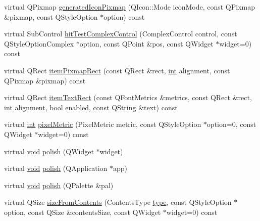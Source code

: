 \begin{DoxyCompactItemize}
\item 
virtual Q\-Pixmap \hyperlink{class_qxt_proxy_style_a77efbe530bb609a94662587fd1b6642b}{generated\-Icon\-Pixmap} (Q\-Icon\-::\-Mode icon\-Mode, const Q\-Pixmap \&pixmap, const Q\-Style\-Option $\ast$option) const 
\item 
virtual Sub\-Control \hyperlink{class_qxt_proxy_style_a85159e7d6e14121e5b3ee33955799f4e}{hit\-Test\-Complex\-Control} (Complex\-Control control, const Q\-Style\-Option\-Complex $\ast$option, const Q\-Point \&pos, const Q\-Widget $\ast$widget=0) const 
\item 
virtual Q\-Rect \hyperlink{class_qxt_proxy_style_ac4f4d852fa825842d91d3c4e7af3154a}{item\-Pixmap\-Rect} (const Q\-Rect \&rect, \hyperlink{ioapi_8h_a787fa3cf048117ba7123753c1e74fcd6}{int} alignment, const Q\-Pixmap \&pixmap) const 
\item 
virtual Q\-Rect \hyperlink{class_qxt_proxy_style_a17a6317af09989533e8a598cf64e03cc}{item\-Text\-Rect} (const Q\-Font\-Metrics \&metrics, const Q\-Rect \&rect, \hyperlink{ioapi_8h_a787fa3cf048117ba7123753c1e74fcd6}{int} alignment, bool enabled, const \hyperlink{group___u_a_v_objects_plugin_gab9d252f49c333c94a72f97ce3105a32d}{Q\-String} \&text) const 
\item 
virtual \hyperlink{ioapi_8h_a787fa3cf048117ba7123753c1e74fcd6}{int} \hyperlink{class_qxt_proxy_style_a14fd21c337d2406c05338b43bc59e9b7}{pixel\-Metric} (Pixel\-Metric metric, const Q\-Style\-Option $\ast$option=0, const Q\-Widget $\ast$widget=0) const 
\item 
virtual \hyperlink{group___u_a_v_objects_plugin_ga444cf2ff3f0ecbe028adce838d373f5c}{void} \hyperlink{class_qxt_proxy_style_ae3ad169526899e419b635bae16b2f228}{polish} (Q\-Widget $\ast$widget)
\item 
virtual \hyperlink{group___u_a_v_objects_plugin_ga444cf2ff3f0ecbe028adce838d373f5c}{void} \hyperlink{class_qxt_proxy_style_a2d43fa8d127be7d3eb4ba9d826c28a1b}{polish} (Q\-Application $\ast$app)
\item 
virtual \hyperlink{group___u_a_v_objects_plugin_ga444cf2ff3f0ecbe028adce838d373f5c}{void} \hyperlink{class_qxt_proxy_style_afa168b50694197845a1e1e876ce2e913}{polish} (Q\-Palette \&pal)
\item 
virtual Q\-Size \hyperlink{class_qxt_proxy_style_acb04af8b796612d0b3c3d5b535a577d6}{size\-From\-Contents} (Contents\-Type \hyperlink{glext_8h_a7d05960f4f1c1b11f3177dc963a45d86}{type}, const Q\-Style\-Option $\ast$option, const Q\-Size \&contents\-Size, const Q\-Widget $\ast$widget=0) const 
\item 

\end{DoxyCompactItemize}
